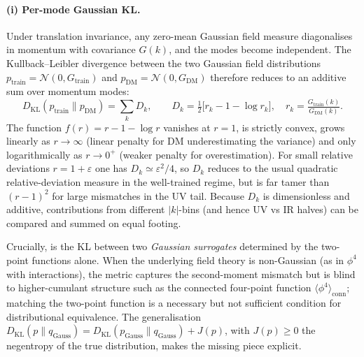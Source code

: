 \paragraph{(i) Per-mode Gaussian KL.}
Under translation invariance, any zero-mean Gaussian field measure diagonalises in momentum with covariance $G(k)$, and the modes become independent. The Kullback--Leibler divergence between the two Gaussian field distributions $p_{\text{train}}=\mathcal{N}(0,G_{\text{train}})$ and $p_{\text{DM}}=\mathcal{N}(0,G_{\text{DM}})$ therefore reduces to an additive sum over momentum modes:
\begin{equation}
D_{\text{KL}}(p_{\text{train}}\|p_{\text{DM}}) = \sum_k D_k,\qquad
D_k = \tfrac{1}{2}\bigl[r_k - 1 - \log r_k\bigr],\quad r_k=\tfrac{G_{\text{train}}(k)}{G_{\text{DM}}(k)}.
\label{eq:per_mode_kl}
\end{equation}
The function $f(r)=r-1-\log r$ vanishes at $r=1$, is strictly convex, grows linearly as $r\to\infty$ (linear penalty for DM underestimating the variance) and only logarithmically as $r\to 0^+$ (weaker penalty for overestimation). For small relative deviations $r=1+\varepsilon$ one has $D_k\simeq\varepsilon^2/4$, so $D_k$ reduces to the usual quadratic relative-deviation measure in the well-trained regime, but is far tamer than $(r-1)^2$ for large mismatches in the UV tail. Because $D_k$ is dimensionless and additive, contributions from different $|k|$-bins (and hence UV vs IR halves) can be compared and summed on equal footing.

Crucially,  is the KL between two \emph{Gaussian surrogates} determined by the two-point functions alone. When the underlying field theory is non-Gaussian (as in $\phi^4$ with interactions), the metric captures the second-moment mismatch but is blind to higher-cumulant structure such as the connected four-point function $\langle\phi^4\rangle_{\text{conn}}$; matching the two-point function is a necessary but not sufficient condition for distributional equivalence. The generalisation $D_{\text{KL}}(p\|q_{\text{Gauss}})=D_{\text{KL}}(p_{\text{Gauss}}\|q_{\text{Gauss}})+J(p)$, with $J(p)\ge 0$ the negentropy of the true distribution, makes the missing piece explicit.

